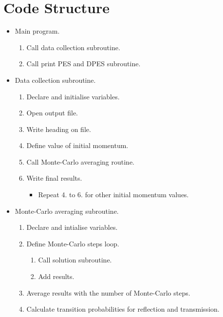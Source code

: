 \section{Code Structure}
%
\begin{itemize}
\item Main program.
\begin{enumerate}
\item Call data collection subroutine.
\item Call print PES and DPES subroutine.
\end{enumerate}
\item Data collection subroutine.
\begin{enumerate}
\item Declare and initialise variables.
\item Open output file.
\item Write heading on file.
\item Define value of initial momentum.
\item Call Monte-Carlo averaging routine.
\item Write final results.
\begin{itemize}
\item Repeat 4. to 6. for other initial momentum values.
\end{itemize}
\end{enumerate}
\end{itemize}

\begin{itemize}
\item Monte-Carlo averaging subroutine.
\begin{enumerate}
\item Declare and intialise variables.
\item Define Monte-Carlo steps loop.
\begin{enumerate}
\item Call solution subroutine.
\item Add results.
\end{enumerate}
\item Average results with the number of Monte-Carlo steps.
\item Calculate transition probabilities for reflection and transmission.
\end{enumerate}
\end{itemize}

